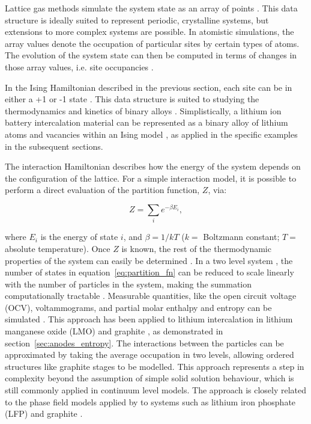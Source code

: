 \documentclass[../main.tex]{subfiles}
\begin{document}
Lattice gas methods simulate the system state as an array of points \cite{Binder2009book}. This data structure is ideally suited to represent periodic, crystalline systems, but extensions to more complex systems are possible. In atomistic simulations, the array values denote the occupation of particular sites by certain types of atoms. The evolution of the system state can then be computed in terms of changes in those array values, i.e. site occupancies \cite{Binder2009book}.
    
In the Ising Hamiltonian described in the previous section, each site can be in either a +1 or -1 state \cite{lee1952}. This data structure is suited to studying the thermodynamics and kinetics of binary alloys \cite{PMERCER2016394,oviedo2015underpotential}. Simplistically, a lithium ion battery intercalation material can be represented as a binary alloy of lithium atoms and vacancies within an Ising model \cite{persson2010,mercer_influence_2017,Kim2001h}, as applied in the specific examples in the subsequent sections.  
    
The interaction Hamiltonian describes how the energy of the system depends on the configuration of the lattice. For a simple interaction model, it is possible to perform a direct evaluation of the partition function, $Z$, via:
    
\begin{equation}
        Z = \sum_{i}e^{-\beta E_{i}},
        \label{eq:partition_fn}
\end{equation}

where $E_{i}$ is the energy of state $i$, and $\beta = 1/kT$ ($k =$ Boltzmann constant; $T=$ absolute temperature). Once $Z$ is known, the rest of the thermodynamic properties of the system can easily be determined \cite{Mercer2019,Leiva2017b,schlueter_quantifying_2018}. In a two level system \cite{Leiva2017b}, the number of states in equation~\ref{eq:partition_fn} can be reduced to scale linearly with the number of particles in the system, making the summation computationally tractable \cite{Mercer2019,Leiva2017b,schlueter_quantifying_2018}. Measurable quantities, like the open circuit voltage (OCV), voltammograms, and partial molar enthalpy and entropy can be simulated \cite{schlueter_quantifying_2018,Leiva2017b,Mercer2019}. This approach has been applied to lithium intercalation in lithium manganese oxide (LMO) \cite{schlueter_quantifying_2018} and graphite \cite{Mercer2019,Leiva2017b}, as demonstrated in section~\ref{sec:anodes_entropy}. The interactions between the particles can be approximated by taking the average occupation in two levels, allowing ordered structures like graphite stages to be modelled. This approach represents a step in complexity beyond the assumption of simple solid solution behaviour, which is still commonly applied in continuum level models. \citeauthor{HAFTBARADARAN2011361} The approach is closely related to the phase field models applied by \citeauthor{Bazant2017} to systems such as lithium iron phosphate (LFP) and graphite \cite{Bazant2017,guo2016,peng2011}.
\end{document}
